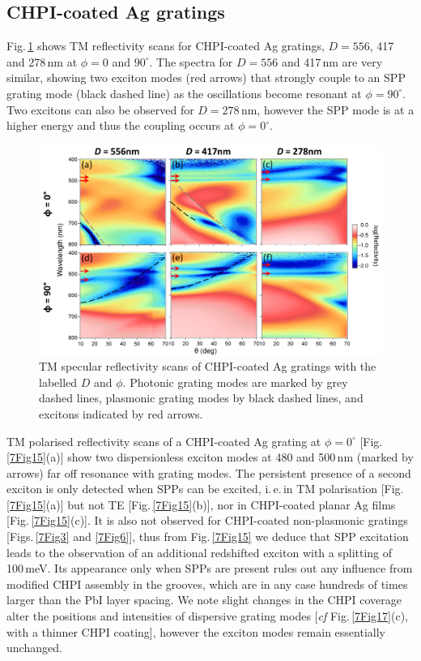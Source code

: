 \subsection{CHPI-coated Ag gratings}
Fig.\,\ref{7Fig14} shows TM reflectivity scans for CHPI-coated Ag gratings, $D=556$, 417 and 278\,nm at $\phi=0$ and $90^{\circ}$. The spectra for $D=556$ and 417\,nm are very similar, showing two exciton modes (red arrows) that strongly couple to an SPP grating mode (black dashed line) as the oscillations become resonant at $\phi=90^{\circ}$. Two excitons can also be observed for $D=278$\,nm, however the SPP mode is at a higher energy and thus the coupling occurs at $\phi=0^{\circ}$.
\begin{figure}[h!] 
\centering    
\includegraphics[width=\textwidth]{Fig14}
\caption{TM specular reflectivity scans of CHPI-coated Ag gratings with the labelled $D$ and $\phi$. Photonic grating modes are marked by grey dashed lines, plasmonic grating modes by black dashed lines, and excitons indicated by red arrows.}
\label{7Fig14}
\end{figure}

TM polarised reflectivity scans of a CHPI-coated Ag grating at $\phi=0^{\circ}$ [Fig.\,\ref{7Fig15}(a)] show two dispersionless exciton modes at 480 and 500\,nm (marked by arrows) far off resonance with grating modes. The persistent presence of a second exciton is only detected when SPPs can be excited, i.\,e.\,in TM polarisation [Fig.\,\ref{7Fig15}(a)] but not TE [Fig.\,\ref{7Fig15}(b)], nor in CHPI-coated planar Ag films [Fig.\,\ref{7Fig15}(c)]. It is also not observed for CHPI-coated non-plasmonic gratings [Figs.\,\ref{7Fig3} and \ref{7Fig6}], thus from Fig.\,\ref{7Fig15} we deduce that SPP excitation leads to the observation of an additional redshifted exciton with a splitting of 100\,meV. Its appearance only when SPPs are present rules out any influence from modified CHPI assembly in the grooves, which are in any case hundreds of times larger than the PbI layer spacing. We note slight changes in the CHPI coverage alter the positions and intensities of dispersive grating modes [\textit{cf} Fig.\,\ref{7Fig17}(c), with a thinner CHPI coating], however the exciton modes remain essentially unchanged.

